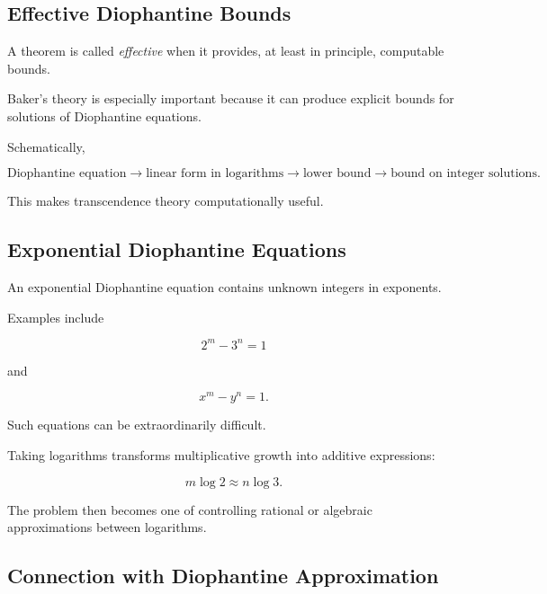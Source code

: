 \subsection{Effective Diophantine Bounds}
\label{subsec:effective-diophantine-bounds}

A theorem is called \emph{effective} when it provides, at least in principle,
computable bounds.

Baker's theory is especially important because it can produce explicit
bounds for solutions of Diophantine equations.

Schematically,

\[
\boxed{
\text{Diophantine equation}
\longrightarrow
\text{linear form in logarithms}
\longrightarrow
\text{lower bound}
\longrightarrow
\text{bound on integer solutions}.
}
\]

This makes transcendence theory computationally useful.

\subsection{Exponential Diophantine Equations}
\label{subsec:exponential-diophantine-equations}

An exponential Diophantine equation contains unknown integers in exponents.

Examples include

\[ 2^m-3^n=1 \]

and

\[ x^m-y^n=1. \]

Such equations can be extraordinarily difficult.

Taking logarithms transforms multiplicative growth into additive
expressions:

\[ m\log2\approx n\log3. \]

The problem then becomes one of controlling rational or algebraic
approximations between logarithms.

\subsection{Connection with Diophantine Approximation}
\label{subsec:transcendence-diophantine-approximation}

